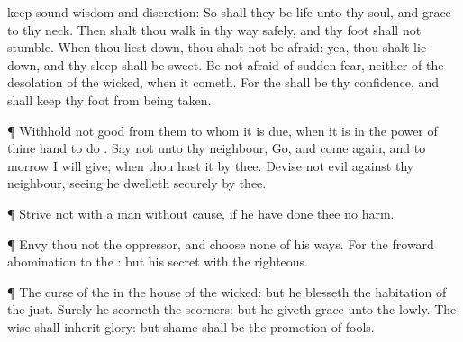{keep sound
wisdom and
discretion:
So shall they be
life unto thy
soul, and
grace to thy
neck.
Then shalt thou
walk in thy
way
safely, and thy
foot shall not
stumble.
When thou liest
down, thou shalt not be
afraid: yea, thou shalt lie
down, and thy
sleep shall be
sweet.
Be not
afraid of
sudden
fear, neither of the
desolation of the
wicked, when it
cometh.
For the
{} shall be thy
confidence, and shall
keep thy
foot from being
taken.
\par }{\PP {}¶
Withhold not
good from them to whom it is
due, when it is in the
power of thine
hand to
do
{}.
Say not unto thy
neighbour,
Go, and come
again, and to
morrow I will
give; when thou
hast it by thee.
Devise not
evil against thy
neighbour, seeing he
dwelleth
securely by thee.
\par }{\PP {}¶
Strive not with a
man without
cause, if he have
done thee no
harm.
\par }{\PP {}¶
Envy thou not the
oppressor, and
choose none of his
ways.
For the
froward
{}
abomination to the
{}: but his
secret
{} with the
righteous.
\par }{\PP {}¶ The
curse of the
{}
{} in the
house of the
wicked: but he
blesseth the
habitation of the
just.
Surely he
scorneth the
scorners: but he
giveth
grace unto the
lowly.
The
wise shall
inherit
glory: but
shame shall be the
promotion of
fools.

}
